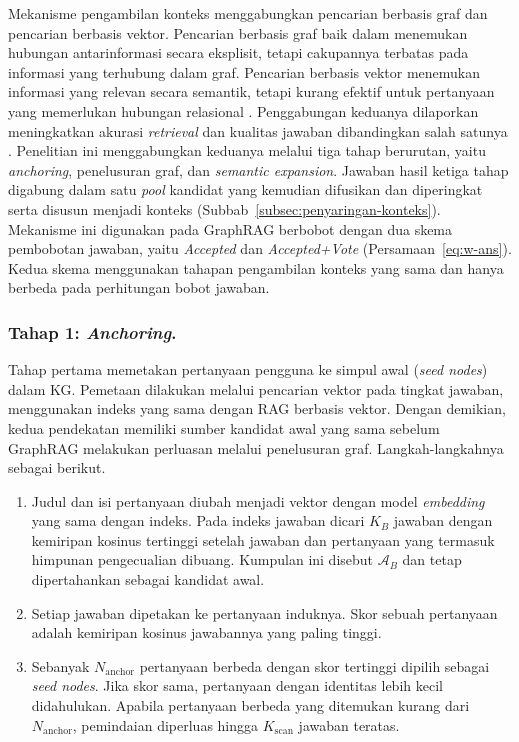 Mekanisme pengambilan konteks menggabungkan pencarian berbasis graf dan pencarian berbasis vektor. Pencarian berbasis graf baik dalam menemukan hubungan antarinformasi secara eksplisit, tetapi cakupannya terbatas pada informasi yang terhubung dalam graf. Pencarian berbasis vektor menemukan informasi yang relevan secara semantik, tetapi kurang efektif untuk pertanyaan yang memerlukan hubungan relasional \autocite{Kamalipour2026}. Penggabungan keduanya dilaporkan meningkatkan akurasi \emph{retrieval} dan kualitas jawaban dibandingkan salah satunya \autocite{sarmah2024hybridrag}. Penelitian ini menggabungkan keduanya melalui tiga tahap berurutan, yaitu \emph{anchoring}, penelusuran graf, dan \emph{semantic expansion}. Jawaban hasil ketiga tahap digabung dalam satu \emph{pool} kandidat yang kemudian difusikan dan diperingkat serta disusun menjadi konteks (Subbab~\ref{subsec:penyaringan-konteks}). Mekanisme ini digunakan pada GraphRAG berbobot dengan dua skema pembobotan jawaban, yaitu \emph{Accepted} dan \emph{Accepted+Vote} (Persamaan~\eqref{eq:w-ans}). Kedua skema menggunakan tahapan pengambilan konteks yang sama dan hanya berbeda pada perhitungan bobot jawaban.

\subsubsection{Tahap 1: \emph{Anchoring}.}
Tahap pertama memetakan pertanyaan pengguna ke simpul awal (\emph{seed nodes}) dalam KG. Pemetaan dilakukan melalui pencarian vektor pada tingkat jawaban, menggunakan indeks yang sama dengan RAG berbasis vektor. Dengan demikian, kedua pendekatan memiliki sumber kandidat awal yang sama sebelum GraphRAG melakukan perluasan melalui penelusuran graf. Langkah-langkahnya sebagai berikut.
\begin{enumerate}
    \item Judul dan isi pertanyaan diubah menjadi vektor dengan model \emph{embedding} yang sama dengan indeks. Pada indeks jawaban dicari $K_B$ jawaban dengan kemiripan kosinus tertinggi setelah jawaban dan pertanyaan yang termasuk himpunan pengecualian dibuang. Kumpulan ini disebut $\mathcal{A}_B$ dan tetap dipertahankan sebagai kandidat awal.
    \item Setiap jawaban dipetakan ke pertanyaan induknya. Skor sebuah pertanyaan adalah kemiripan kosinus jawabannya yang paling tinggi.
    \item Sebanyak $N_{\mathrm{anchor}}$ pertanyaan berbeda dengan skor tertinggi dipilih sebagai \emph{seed nodes}. Jika skor sama, pertanyaan dengan identitas lebih kecil didahulukan. Apabila pertanyaan berbeda yang ditemukan kurang dari $N_{\mathrm{anchor}}$, pemindaian diperluas hingga $K_{\mathrm{scan}}$ jawaban teratas.
\end{enumerate}

